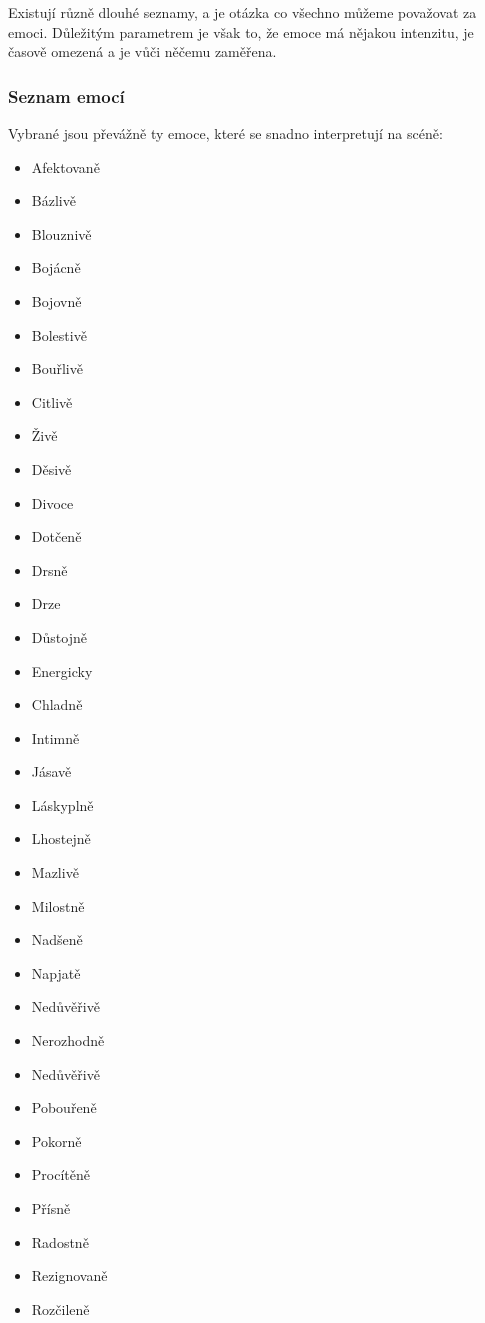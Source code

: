 \documentclass[main.tex]{subfiles}
\begin{document}
Existují různě dlouhé seznamy, a je otázka co všechno můžeme považovat za emoci. 
Důležitým parametrem je však to, že emoce má nějakou intenzitu, je časově omezená a je vůči něčemu zaměřena. 
 
\subsubsection{Seznam emocí} Vybrané jsou převážně ty emoce, které se snadno interpretují na scéně: 
 
\begin{multicols}{3} 
\begin{itemize}
\item  Afektovaně
\item  Bázlivě
\item  Blouznivě
\item  Bojácně
\item  Bojovně
\item  Bolestivě
\item  Bouřlivě
\item  Citlivě
\item  Živě
\item  Děsivě
\item  Divoce
\item  Dotčeně
\item  Drsně
\item  Drze
\item  Důstojně
\item  Energicky
\item  Chladně
\item  Intimně
\item  Jásavě
\item  Láskyplně
\item  Lhostejně
\item  Mazlivě
\item  Milostně
\item  Nadšeně
\item  Napjatě
\item  Nedůvěřivě
\item  Nerozhodně
\item  Nedůvěřivě
\item  Pobouřeně
\item  Pokorně
\item  Procítěně
\item  Přísně
\item  Radostně
\item  Rezignovaně
\item  Rozčileně

\end{itemize}
\end{multicols}
\end{document}
